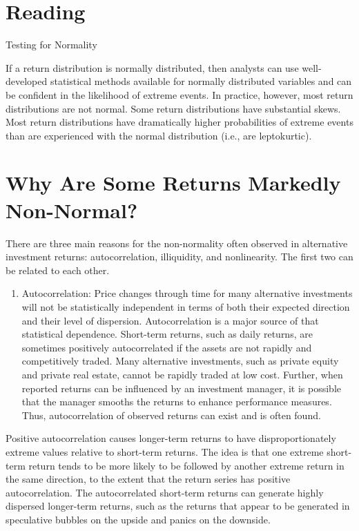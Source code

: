 \documentclass[11pt]{article}
\begin{document}
\section*{Reading}
Testing for Normality

If a return distribution is normally distributed, then analysts can use well-developed statistical methods available for normally distributed variables and can be confident in the likelihood of extreme events. In practice, however, most return distributions are not normal. Some return distributions have substantial skews. Most return distributions have dramatically higher probabilities of extreme events than are experienced with the normal distribution (i.e., are leptokurtic).

\section*{Why Are Some Returns Markedly Non-Normal?}
There are three main reasons for the non-normality often observed in alternative investment returns: autocorrelation, illiquidity, and nonlinearity. The first two can be related to each other.

\begin{enumerate}
  \item Autocorrelation: Price changes through time for many alternative investments will not be statistically independent in terms of both their expected direction and their level of dispersion. Autocorrelation is a major source of that statistical dependence. Short-term returns, such as daily returns, are sometimes positively autocorrelated if the assets are not rapidly and competitively traded. Many alternative investments, such as private equity and private real estate, cannot be rapidly traded at low cost. Further, when reported returns can be influenced by an investment manager, it is possible that the manager smooths the returns to enhance performance measures. Thus, autocorrelation of observed returns can exist and is often found.
\end{enumerate}

Positive autocorrelation causes longer-term returns to have disproportionately extreme values relative to short-term returns. The idea is that one extreme short-term return tends to be more likely to be followed by another extreme return in the same direction, to the extent that the return series has positive autocorrelation. The autocorrelated short-term returns can generate highly dispersed longer-term returns, such as the returns that appear to be generated in speculative bubbles on the upside and panics on the downside.
\end{document}
